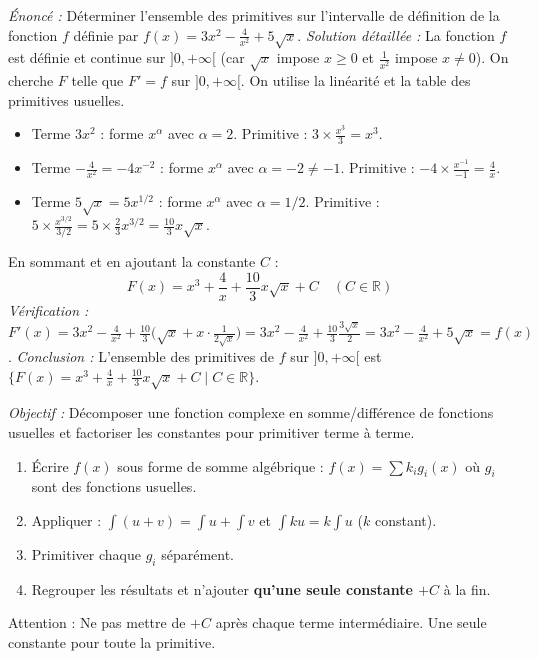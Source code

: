 \documentclass[11pt]{article}
\newcommand{\cle}[1]{{\popxbold\color{popdark}#1}}
\begin{document}
\begin{exoresolu}
\emph{Énoncé :} Déterminer l'ensemble des primitives sur l'intervalle de définition de la fonction $f$ définie par $f(x)=3x^2 - \frac{4}{x^2} + 5\sqrt{x}$.
\tcblower
\emph{Solution détaillée :}
La fonction $f$ est définie et continue sur $]0, +\infty[$ (car $\sqrt{x}$ impose $x \ge 0$ et $\frac{1}{x^2}$ impose $x \neq 0$). On cherche $F$ telle que $F'=f$ sur $]0, +\infty[$. On utilise la linéarité et la table des primitives usuelles.
\begin{itemize}
    \item Terme $3x^2$ : forme $x^\alpha$ avec $\alpha=2$. Primitive : $3 \times \frac{x^{3}}{3} = x^3$.
    \item Terme $-\frac{4}{x^2} = -4x^{-2}$ : forme $x^\alpha$ avec $\alpha=-2 \neq -1$. Primitive : $-4 \times \frac{x^{-1}}{-1} = \frac{4}{x}$.
    \item Terme $5\sqrt{x} = 5x^{1/2}$ : forme $x^\alpha$ avec $\alpha=1/2$. Primitive : $5 \times \frac{x^{3/2}}{3/2} = 5 \times \frac{2}{3}x^{3/2} = \frac{10}{3}x\sqrt{x}$.
\end{itemize}
En sommant et en ajoutant la constante $C$ :
\[ F(x) = x^3 + \frac{4}{x} + \frac{10}{3}x\sqrt{x} + C \quad (C \in \mathbb{R}) \]
\emph{Vérification :} $F'(x) = 3x^2 - \frac{4}{x^2} + \frac{10}{3}\bigl(\sqrt{x} + x \cdot \frac{1}{2\sqrt{x}}\bigr) = 3x^2 - \frac{4}{x^2} + \frac{10}{3}\frac{3\sqrt{x}}{2} = 3x^2 - \frac{4}{x^2} + 5\sqrt{x} = f(x)$.
\emph{Conclusion :} L'ensemble des primitives de $f$ sur $]0, +\infty[$ est $\{ F(x) = x^3 + \frac{4}{x} + \frac{10}{3}x\sqrt{x} + C \mid C \in \mathbb{R} \}$.
\end{exoresolu}

\begin{methode}
\emph{Objectif :} Décomposer une fonction complexe en somme/différence de fonctions usuelles et factoriser les constantes pour primitiver terme à terme.
\begin{enumerate}
    \item Écrire $f(x)$ sous forme de somme algébrique : $f(x) = \sum k_i g_i(x)$ où $g_i$ sont des fonctions usuelles.
    \item Appliquer : $\int (u+v) = \int u + \int v$ et $\int k u = k \int u$ ($k$ constant).
    \item Primitiver chaque $g_i$ séparément.
    \item Regrouper les résultats et n'ajouter \textbf{qu'une seule constante $+C$} à la fin.
\end{enumerate}
\cle{Attention :} Ne pas mettre de $+C$ après chaque terme intermédiaire. Une seule constante pour toute la primitive.
\end{methode}
\end{document}
